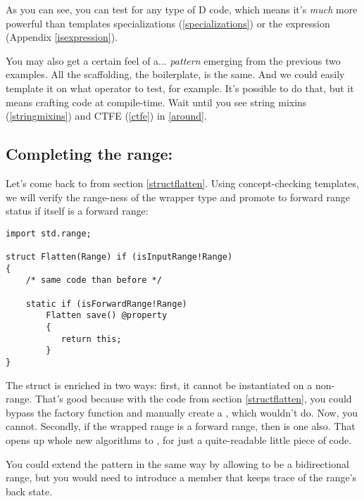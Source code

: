 As you can see, you can test for any type of D code, which means it's \emph{much} more powerful than templates specializations (\ref{specializations}) or the  expression (Appendix \ref{isexpression}).

You may also get a certain feel of a... \emph{pattern} emerging from the previous two examples. All the scaffolding, the boilerplate, is the same. And we could easily template it on what operator to test, for example. It's possible to do that, but it means crafting code at compile-time. Wait until you see string mixins (\ref{stringmixins}) and CTFE (\ref{ctfe}) in \autoref{around}.

\subsection{Completing the  range:} 

Let's come back to  from section \ref{structflatten}. Using concept-checking templates, we will verify the range-ness of the wrapper type and promote  to forward range status if  itself is a forward range:

\begin{verbatim}
import std.range;

struct Flatten(Range) if (isInputRange!Range)
{
    /* same code than before */

    static if (isForwardRange!Range)
        Flatten save() @property
        {
           return this;
        }
}
\end{verbatim}

The struct is enriched in two ways: first, it cannot be instantiated on a non-range. That's good because with the code from section \ref{structflatten}, you could bypass the factory function and manually create a , which wouldn't do. Now, you cannot. Secondly, if the wrapped range is a forward range, then  is one also. That opens up whole new algorithms to , for just a quite-readable little piece of code.

You could extend the pattern in the same way by allowing  to be a bidirectional range, but you would need to introduce a  member that keeps trace of the range's back state.


